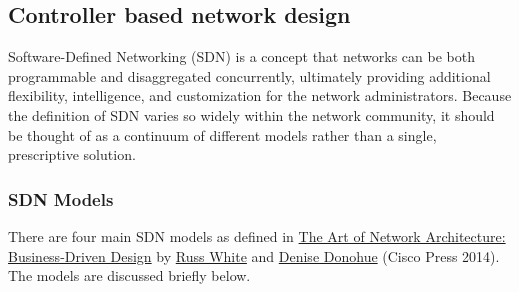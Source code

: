 \subsection{Controller based network design}
Software-Defined Networking (SDN) is a concept that networks can be both
programmable and disaggregated concurrently, ultimately providing additional
flexibility, intelligence, and customization for the network administrators.
Because the definition of SDN varies so widely within the network community,
it should be thought of as a continuum of different models rather than a
single, prescriptive solution.

\subsubsection{SDN Models}
There are four main SDN models as defined in
\href{http://www.ciscopress.com/store/art-of-network-architecture-business-driven-design-9780133259230}{The Art of Network Architecture: Business-Driven Design} by
\href{https://twitter.com/rtggeek}{Russ White} and
\href{ihttps://twitter.com/LadyNetwkr}{Denise Donohue} (Cisco Press 2014).
The models are discussed briefly below.

